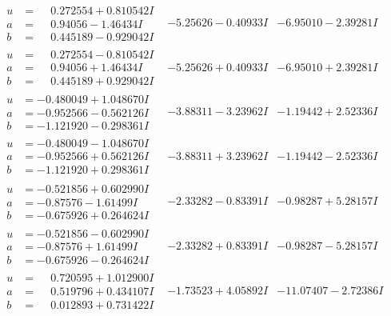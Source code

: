 \documentclass[1p]{elsarticle_modified}
\theoremstyle{definition}
\begin{document}
$$\begin{array}{c|c|c}
\begin{aligned}
u &= \phantom{-}0.272554 + 0.810542 I \\
a &= \phantom{-}0.94056 - 1.46434 I \\
b &= \phantom{-}0.445189 - 0.929042 I\end{aligned}
 & -5.25626 - 0.40933 I & -6.95010 - 2.39281 I \\ \hline\begin{aligned}
u &= \phantom{-}0.272554 - 0.810542 I \\
a &= \phantom{-}0.94056 + 1.46434 I \\
b &= \phantom{-}0.445189 + 0.929042 I\end{aligned}
 & -5.25626 + 0.40933 I & -6.95010 + 2.39281 I \\ \hline\begin{aligned}
u &= -0.480049 + 1.048670 I \\
a &= -0.952566 - 0.562126 I \\
b &= -1.121920 - 0.298361 I\end{aligned}
 & -3.88311 - 3.23962 I & -1.19442 + 2.52336 I \\ \hline\begin{aligned}
u &= -0.480049 - 1.048670 I \\
a &= -0.952566 + 0.562126 I \\
b &= -1.121920 + 0.298361 I\end{aligned}
 & -3.88311 + 3.23962 I & -1.19442 - 2.52336 I \\ \hline\begin{aligned}
u &= -0.521856 + 0.602990 I \\
a &= -0.87576 - 1.61499 I \\
b &= -0.675926 + 0.264624 I\end{aligned}
 & -2.33282 - 0.83391 I & -0.98287 + 5.28157 I \\ \hline\begin{aligned}
u &= -0.521856 - 0.602990 I \\
a &= -0.87576 + 1.61499 I \\
b &= -0.675926 - 0.264624 I\end{aligned}
 & -2.33282 + 0.83391 I & -0.98287 - 5.28157 I \\ \hline\begin{aligned}
u &= \phantom{-}0.720595 + 1.012900 I \\
a &= \phantom{-}0.519796 + 0.434107 I \\
b &= \phantom{-}0.012893 + 0.731422 I\end{aligned}
 & -1.73523 + 4.05892 I & -11.07407 - 2.72386 I \\ \hline\begin{aligned}

\end{aligned}
\end{array}$$
\end{document}
